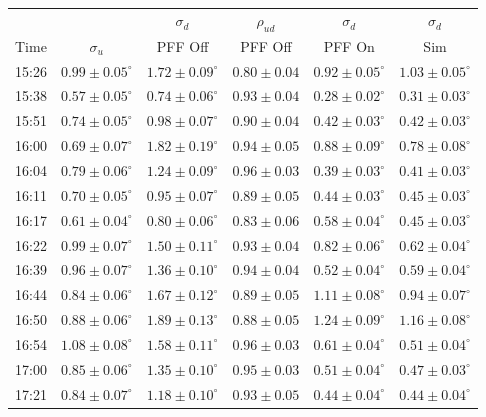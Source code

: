 {\begin{minipage}{\linewidth}
    \begin{tabular}{| c  c  c  c  c  c  |}
	   \hline
	           &   & \(\sigma_d\) & \(\rho_{ud}\)  & \(\sigma_d\)  & \(\sigma_d\)  \\
       Time & \(\sigma_u\) &  PFF Off &  PFF Off &  PFF On &  Sim \\ \hline
15:26 & \(0.99\pm0.05^\circ\) & \(1.72\pm0.09^\circ\) & \(0.80\pm0.04\) & \(0.92\pm0.05^\circ\) & \(1.03\pm0.05^\circ\) \\
15:38 & \(0.57\pm0.05^\circ\) & \(0.74\pm0.06^\circ\) & \(0.93\pm0.04\) & \(0.28\pm0.02^\circ\) & \(0.31\pm0.03^\circ\) \\
15:51 & \(0.74\pm0.05^\circ\) & \(0.98\pm0.07^\circ\) & \(0.90\pm0.04\) & \(0.42\pm0.03^\circ\) & \(0.42\pm0.03^\circ\) \\
16:00 & \(0.69\pm0.07^\circ\) & \(1.82\pm0.19^\circ\) & \(0.94\pm0.05\) & \(0.88\pm0.09^\circ\) & \(0.78\pm0.08^\circ\) \\
16:04 & \(0.79\pm0.06^\circ\) & \(1.24\pm0.09^\circ\) & \(0.96\pm0.03\) & \(0.39\pm0.03^\circ\) & \(0.41\pm0.03^\circ\) \\
16:11 & \(0.70\pm0.05^\circ\) & \(0.95\pm0.07^\circ\) & \(0.89\pm0.05\) & \(0.44\pm0.03^\circ\) & \(0.45\pm0.03^\circ\) \\
16:17 & \(0.61\pm0.04^\circ\) & \(0.80\pm0.06^\circ\) & \(0.83\pm0.06\) & \(0.58\pm0.04^\circ\) & \(0.45\pm0.03^\circ\) \\
16:22 & \(0.99\pm0.07^\circ\) & \(1.50\pm0.11^\circ\) & \(0.93\pm0.04\) & \(0.82\pm0.06^\circ\) & \(0.62\pm0.04^\circ\) \\
16:39 & \(0.96\pm0.07^\circ\) & \(1.36\pm0.10^\circ\) & \(0.94\pm0.04\) & \(0.52\pm0.04^\circ\) & \(0.59\pm0.04^\circ\) \\
16:44 & \(0.84\pm0.06^\circ\) & \(1.67\pm0.12^\circ\) & \(0.89\pm0.05\) & \(1.11\pm0.08^\circ\) & \(0.94\pm0.07^\circ\) \\
16:50 & \(0.88\pm0.06^\circ\) & \(1.89\pm0.13^\circ\) & \(0.88\pm0.05\) & \(1.24\pm0.09^\circ\) & \(1.16\pm0.08^\circ\) \\
16:54 & \(1.08\pm0.08^\circ\) & \(1.58\pm0.11^\circ\) & \(0.96\pm0.03\) & \(0.61\pm0.04^\circ\) & \(0.51\pm0.04^\circ\) \\
17:00 & \(0.85\pm0.06^\circ\) & \(1.35\pm0.10^\circ\) & \(0.95\pm0.03\) & \(0.51\pm0.04^\circ\) & \(0.47\pm0.03^\circ\) \\
17:21 & \(0.84\pm0.07^\circ\) & \(1.18\pm0.10^\circ\) & \(0.93\pm0.05\) & \(0.44\pm0.04^\circ\) & \(0.44\pm0.04^\circ\) \\

\end{tabular}
\end{minipage}}

